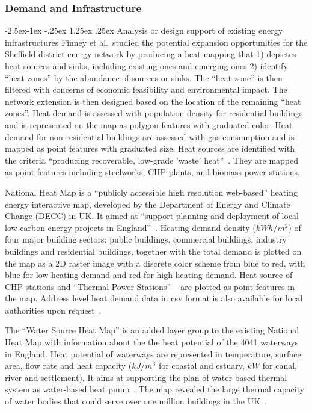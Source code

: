 \documentclass[hidelinks,12pt]{article}
\makeatletter
\renewcommand\paragraph{\@startsection{paragraph}{4}{\z@}%
            {-2.5ex\@plus -1ex \@minus -.25ex}%
            {1.25ex \@plus .25ex}%
            {\normalfont\normalsize\bfseries}}
\makeatother
\begin{document}
\subsubsection{Demand and Infrastructure}
\paragraph{Analysis or design support of existing energy
  infrastructures}\label{infra}
Finney et al.\ studied the potential expansion opportunities for the
Sheffield district energy network by producing a heat mapping that 1)
depictes heat sources and sinks, including existing ones and emerging
ones 2) identify ``heat zones'' by the abundance of sources or
sinks. The ``heat zone'' is then filtered with concerns of economic
feasibility and environmental impact. The network extension is then
designed based on the location of the remaining ``heat zones''. Heat
demand is assessed with population density for residential buildings
and is represented on the map as polygon features with graduated
color. Heat demand for non-residential buildings are assessed with gas
consumption and is mapped as point features with graduated size. Heat
sources are identified with the criteria ``producing recoverable,
low-grade 'waste' heat''~\cite{Finney2012165}. They are mapped as
point features including steelworks, CHP plants, and biomass power
stations.

National Heat Map is a ``publicly accessible high resolution
web-based'' heating energy interactive map, developed by the
Department of Energy and Climate Change (DECC) in UK. It aimed at
``support planning and deployment of local low-carbon energy projects
in England''~\cite{heatMap2015}. Heating demand density ($kWh/m^2$) of
four major building sectors: public buildings, commercial buildings,
industry buildings and residential buildings, together with the total
demand is plotted on the map as a 2D raster image with a discrete
color scheme from blue to red, with blue for low heating demand and
red for high heating demand. Heat source of CHP stations and ``Thermal
Power Stations'' ~\cite{heatMap2012} are plotted as point features in
the map. Address level heat demand data in csv format is also
available for local authorities upon request~\cite{heatMapLocal2012}.

The ``Water Source Heat Map'' is an added layer group to the existing
National Heat Map with information about the the heat potential of the
4041 waterways in England. Heat potential of waterways are represented
in temperature, surface area, flow rate and heat capacity ($kJ/m^3$
for coastal and estuary, $kW$ for canal, river and settlement). It
aims at supporting the plan of water-based thermal system as
water-based heat pump~\cite{waterHeatMap}. The map revealed the large
thermal capacity of water bodies that could serve over one million
buildings in the UK~\cite{waterHeatMap}.
\end{document}
